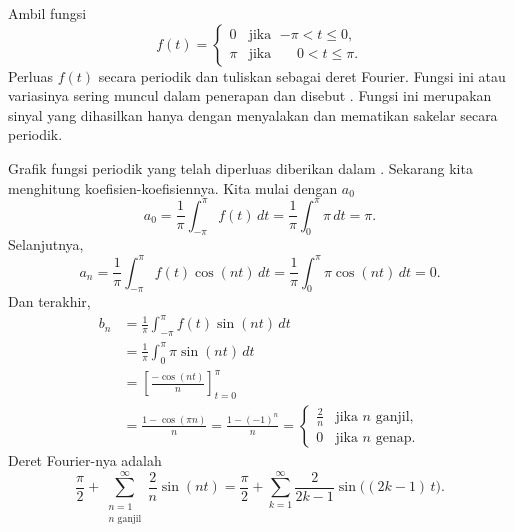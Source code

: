 \begin{example}
Ambil fungsi
\begin{equation*}
f(t) =
\begin{cases}
0 & \text{jika } \;{-\pi} < t \leq 0 , \\
\pi & \text{jika } \;\phantom{-}0 < t \leq \pi .
\end{cases}
\end{equation*}
\nopagebreak[4]%
Perluas $f(t)$ secara periodik dan tuliskan
sebagai deret Fourier.  Fungsi ini atau variasinya sering muncul
dalam penerapan dan disebut
\emph{}.  Fungsi ini merupakan sinyal
yang dihasilkan hanya dengan menyalakan dan mematikan sakelar secara periodik.

\begin{myfig}
\capstart
{}
\caption{Grafik fungsi gelombang persegi.\label{ts:squarewavefig}}
\end{myfig}

\pagebreak[2]
Grafik fungsi periodik yang telah diperluas diberikan dalam
.
Sekarang kita menghitung koefisien-koefisiennya.  Kita mulai dengan $a_0$
\begin{equation*}
a_0 = \frac{1}{\pi} \int_{-\pi}^\pi f(t) \,dt
= \frac{1}{\pi} \int_{0}^\pi \pi \,dt = \pi .
\end{equation*}
Selanjutnya,
\begin{equation*}
a_n = \frac{1}{\pi} \int_{-\pi}^\pi f(t) \cos (nt) \,dt 
= \frac{1}{\pi} \int_{0}^\pi \pi \cos (nt) \,dt = 0 .
\end{equation*}
Dan terakhir,
\begin{equation*}
\begin{split}
b_n & = \frac{1}{\pi} \int_{-\pi}^\pi f(t) \sin (nt) \,dt \\
& = \frac{1}{\pi} \int_{0}^\pi \pi \sin (nt) \,dt \\
& = \left[ \frac{- \cos (nt)}{n} \right]_{t=0}^\pi \\
& = \frac{1 - \cos (\pi n)}{n}
= \frac{1 - {(-1)}^n}{n}
=
\begin{cases}
\frac{2}{n} & \text{jika } n \text{ ganjil} , \\
0 & \text{jika } n \text{ genap} .
\end{cases}
\end{split}
\end{equation*}
Deret Fourier-nya adalah
\begin{equation*}
\frac{\pi}{2} +  \sum_{\substack{n=1\\n \text{ ganjil}}}^\infty
\frac{2}{n} 
\sin (n t)
=
\frac{\pi}{2} + \sum_{k=1}^\infty
\frac{2}{2k-1} 
\sin \bigl( (2k-1)\, t \bigr) .
\end{equation*}


\end{example}
